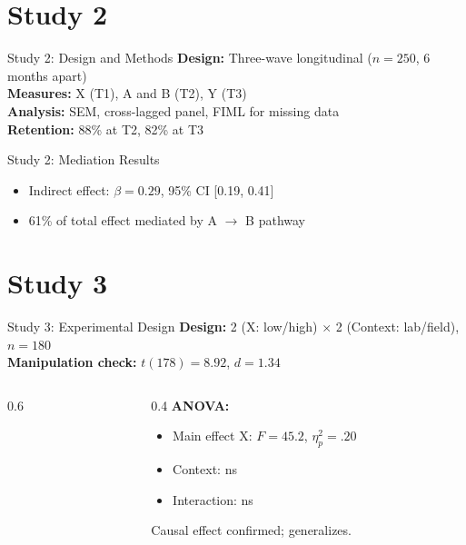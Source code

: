 \documentclass[aspectratio=169,12pt]{beamer}
\begin{document}
\section{Study 2}

\begin{frame}{Study 2: Design and Methods}
  \textbf{Design:} Three-wave longitudinal ($n=250$, 6 months apart)\\
  \textbf{Measures:} X (T1), A and B (T2), Y (T3)\\
  \textbf{Analysis:} SEM, cross-lagged panel, FIML for missing data\\[0.5cm]
  \textbf{Retention:} 88\% at T2, 82\% at T3
\end{frame}

\begin{frame}{Study 2: Mediation Results}
  \begin{figure}
  \end{figure}
  \begin{itemize}
    \item Indirect effect: $\beta = 0.29$, 95\% CI [0.19, 0.41]
    \item \alert{61\% of total effect mediated by A $\to$ B pathway}
  \end{itemize}
\end{frame}

\section{Study 3}

\begin{frame}{Study 3: Experimental Design}
  \textbf{Design:} 2 (X: low/high) $\times$ 2 (Context: lab/field), $n=180$\\
  \textbf{Manipulation check:} $t(178) = 8.92$, $d = 1.34$\\[0.5cm]
  \begin{columns}[c]
    \begin{column}{0.6\textwidth}
    \end{column}
    \begin{column}{0.4\textwidth}
      \textbf{ANOVA:}
      \begin{itemize}
        \item Main effect X: $F = 45.2$, $\eta^2_p = .20$
        \item Context: ns
        \item Interaction: ns
      \end{itemize}
      \alert{Causal effect confirmed; generalizes.}
    \end{column}
  \end{columns}
\end{frame}
\end{document}
